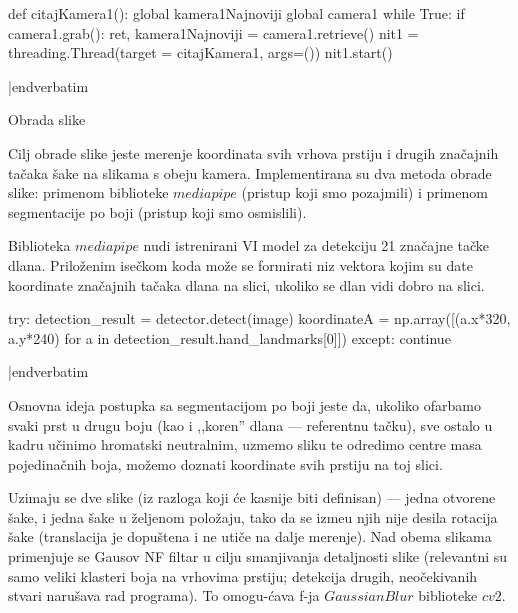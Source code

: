 {\eightpoint
\verbatim


def citajKamera1():
  global kamera1Najnoviji
  global camera1
  while True:
    if camera1.grab():
      ret, kamera1Najnoviji = camera1.retrieve()
nit1 = threading.Thread(target = citajKamera1, args=())
nit1.start()

|endverbatim
}
\heading
Obrada slike
\endheading

Cilj obrade slike jeste merenje koordinata svih vrhova prstiju i drugih zna\v{c}ajnih ta\v{c}aka \v{s}ake na slikama s obeju kamera. Implementirana su dva metoda obrade slike: primenom biblioteke $mediapipe$ (pristup koji smo pozajmili) i primenom segmentacije po boji (pristup koji smo osmislili).

\roster

\item
Biblioteka $mediapipe$ nudi istrenirani VI model za detekciju 21 zna\v{c}ajne ta\v{c}ke dlana. Prilo\v{z}enim ise\v{c}kom koda mo\v{z}e se formirati niz vektora kojim su date koordinate zna\v{c}ajnih ta\v{c}aka dlana na slici, ukoliko se dlan vidi dobro na slici.
{\eightpoint
\verbatim


try:
    detection_result = detector.detect(image)
    koordinateA = np.array([(a.x*320, a.y*240) 
         for a in detection_result.hand_landmarks[0]])
except:
    continue

|endverbatim
}
\item
Osnovna ideja postupka sa segmentacijom po boji jeste da, ukoliko ofarbamo svaki prst u drugu boju (kao i ,,koren'' dlana --- referentnu ta\v{c}ku), sve ostalo u kadru u\v{c}inimo hromatski neutralnim, uzmemo sliku te odredimo centre masa pojedina\v{c}nih boja, mo\v{z}emo doznati koordinate svih prstiju na toj slici.

Uzimaju se dve slike (iz razloga koji \'ce kasnije biti definisan) --- jedna otvorene \v{s}ake, i jedna \v{s}ake u \v{z}eljenom polo\v{z}aju, tako da se izme\dj u njih nije desila rotacija \v{s}ake (translacija je dopu\v{s}tena i ne uti\v{c}e na dalje merenje). Nad obema slikama primenjuje se Gausov NF filtar u cilju smanjivanja detaljnosti slike (relevantni su samo veliki klasteri boja na vrhovima prstiju; detekcija drugih, neo\v{c}ekivanih stvari naru\v{s}ava rad programa). To omogu-\'cava f-ja $GaussianBlur$ biblioteke $cv2$. 

